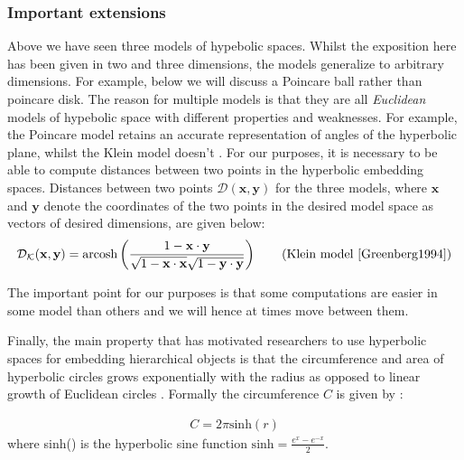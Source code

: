 \documentclass[12pt]{report}
\begin{document}
\subsubsection{Important extensions}
Above we have seen three models of hypebolic spaces. Whilst the exposition here has been given in two and three dimensions, the models generalize to arbitrary dimensions. For example, below we will discuss a Poincare ball rather than poincare disk. The reason for multiple models is that they are all \textit{Euclidean} models of hypebolic space with different properties and weaknesses. For example, the Poincare model retains an accurate representation of angles of the hyperbolic plane, whilst the Klein model doesn't \cite{Greenberg1994}. For our purposes, it is necessary to be able to compute distances between two points in the hyperbolic embedding spaces. Distances between two points $\mathcal{D}(\mathbf{x}, \mathbf{y})$ for the three models, where $\mathbf{x}$ and $\mathbf{y}$ denote the coordinates of the two points in the desired model space as vectors of desired dimensions, are given below:
\begin{align}
  \mathcal{D_K}(\mathbf{x}, \mathbf{y}) = \text{arcosh} \left( \frac{1 - \mathbf{x} \cdot \mathbf{y}}{\sqrt{1-\mathbf{x}\cdot \mathbf{x}}\sqrt{1-\mathbf{y}\cdot \mathbf{y}}}   \right) \tag{Klein model \cite{Greenberg1994}}
\end{align}





The important point for our purposes is that some computations are easier in some model than others and we will hence at times move between them. 










Finally, the main property that has motivated researchers to use hyperbolic spaces for embedding hierarchical objects is that the circumference and area of hyperbolic circles grows exponentially with the radius as opposed to linear growth of Euclidean circles \cite{Nickel2018} \cite{Chamberlain2017}. Formally the circumference $C$ is given by \cite{Greenberg1994}:

\begin{align*}
  C = 2 \pi \text{sinh}(r)
\end{align*}
where sinh() is the hyperbolic sine function $\text{sinh}=\frac{e^x - e^{-x}}{2}$.



\end{document}
